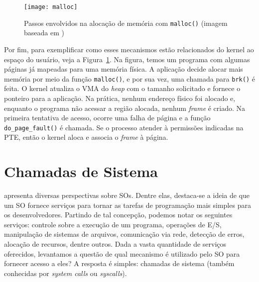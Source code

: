 %

\begin{figure}[!h]
  \centering
  \texttt{[image: malloc]}
  \caption{Passos envolvidos na alocação de memória com \texttt{malloc()} (imagem baseada em \cite{anatomy_program_mem})}
  \label{fig:malloc_linux}
\end{figure}

Por fim, para exemplificar como esses mecanismos estão relacionados do kernel ao
espaço do usuário, veja a Figura~\ref{fig:malloc_linux}. Na figura, temos um programa com
algumas páginas já mapeadas para uma memória física. A aplicação decide alocar
mais memória por meio da função \texttt{malloc()}, e por sua vez, uma chamada
para \texttt{brk()} é feita. O kernel atualiza o VMA do \textit{heap} com o
tamanho solicitado e fornece o ponteiro para a aplicação. Na prática, nenhum
endereço físico foi alocado e, enquanto o programa não acessar a região alocada,
nenhum \emph{frame} é criado. Na primeira tentativa de acesso, ocorre uma falha
de página e a função \texttt{do\_page\_fault()} é chamada. Se o processo
atender à permissões indicadas na PTE, então o kernel aloca e associa o
\emph{frame} à página.

\section{Chamadas de Sistema}

\citet{silberschatz} apresenta diversas perspectivas sobre SOs. Dentre elas,
destaca-se a ideia de que um SO fornece serviços para tornar as tarefas de
programação mais simples para os desenvolvedores. Partindo de tal concepção,
podemos notar os seguintes serviços: controle sobre a execução de um programa,
operações de E/S, manipulação de sistemas de arquivos, comunicação via rede,
detecção de erros, alocação de recursos, dentre outros. Dada a vasta quantidade
de serviços oferecidos, levantamos a questão de qual mecanismo é utilizado pelo
SO para fornecer acesso a eles? A resposta é simples: chamadas de
sistema (também conhecidas por \emph{system calls} ou \emph{syscalls}).

